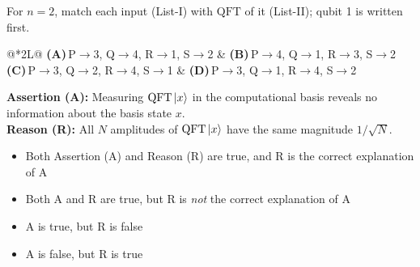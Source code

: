 \documentclass[11pt,a4paper]{article}
\newcommand{\optlabel}[1]{\textbf{(#1)}}
\newenvironment{qitem}[1]{\begin{list}{}{\setlength{\leftmargin}{3.3em}\setlength{\labelwidth}{3.1em}%
  \setlength{\labelsep}{0.2em}\setlength{\topsep}{3pt}\setlength{\parsep}{3pt}}\item[\textbf{Q.#1}\hfill]}{\end{list}}
\newcommand{\qsep}{\par\vspace{2pt}{\color{black!15}\hrule}\vspace{4pt}}
\begin{document}
\begin{qitem}{56}
For $n = 2$, match each input (List-I) with $\mathrm{QFT}$ of it (List-II); qubit 1 is written first.
\par\smallskip{}
\par\smallskip\noindent\begin{tabularx}{\linewidth}{@{}*{2}{L}@{}}
\optlabel{A}\,P$\to$3, Q$\to$4, R$\to$1, S$\to$2 & \optlabel{B}\,P$\to$4, Q$\to$1, R$\to$3, S$\to$2 \\[3pt]
\optlabel{C}\,P$\to$3, Q$\to$2, R$\to$4, S$\to$1 & \optlabel{D}\,P$\to$3, Q$\to$1, R$\to$4, S$\to$2
\end{tabularx}
\end{qitem}
\qsep

\begin{qitem}{57}
\textbf{Assertion (A):} Measuring $\mathrm{QFT}\ket{x}$ in the computational basis reveals no information about the
basis state $x$.\\[1mm]
\textbf{Reason (R):} All $N$ amplitudes of $\mathrm{QFT}\ket{x}$ have the same magnitude $1/\sqrt N$.
\begin{itemize}[leftmargin=2.6em, labelsep=0.4em, itemsep=2pt, topsep=3pt]
\item[\optlabel{A}] Both Assertion (A) and Reason (R) are true, and R is the correct explanation of A
\item[\optlabel{B}] Both A and R are true, but R is \emph{not} the correct explanation of A
\item[\optlabel{C}] A is true, but R is false
\item[\optlabel{D}] A is false, but R is true
\end{itemize}
\end{qitem}
\qsep
\end{document}

